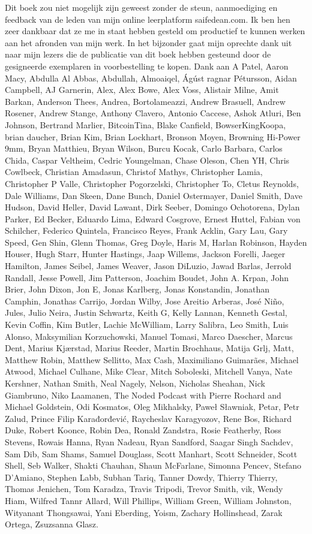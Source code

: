 \documentclass[
  a5paper,
  smalldemyvopaper,11pt,twoside,onecolumn,openright,extrafontsizes,
hidelinks]{memoir}
\begin{document}
Dit boek zou niet mogelijk zijn geweest zonder de steun, aanmoediging en
feedback van de leden van mijn online leerplatform saifedean.com. Ik ben
hen zeer dankbaar dat ze me in staat hebben gesteld om productief te
kunnen werken aan het afronden van mijn werk. In het bijzonder gaat mijn
oprechte dank uit naar mijn lezers die de publicatie van dit boek hebben
gesteund door de gesigneerde exemplaren in voorbestelling te kopen. Dank
aan A Patel, Aaron Macy, Abdulla Al Abbas, Abdullah, Almoaiqel, Ágúst
ragnar Pétursson, Aidan Campbell, AJ Garnerin, Alex, Alex Bowe, Alex
Voss, Alistair Milne, Amit Barkan, Anderson Thees, Andrea,
Bortolameazzi, Andrew Brasuell, Andrew Rosener, Andrew Stange, Anthony
Clavero, Antonio Caccese, Ashok Atluri, Ben Johnson, Bertrand Marlier,
BitcoinTina, Blake Canfield, BowserKingKoopa, brian daucher, Brian Kim,
Brian Lockhart, Bronson Moyen, Browning Hi-Power 9mm, Bryan Matthieu,
Bryan Wilson, Burcu Kocak, Carlo Barbara, Carlos Chida, Caspar Veltheim,
Cedric Youngelman, Chase Oleson, Chen YH, Chris Cowlbeck, Christian
Amadasun, Christof Mathys, Christopher Lamia, Christopher P Valle,
Christopher Pogorzelski, Christopher To, Cletus Reynolds, Dale Williams,
Dan Skeen, Dane Bunch, Daniel Ostermayer, Daniel Smith, Dave Hudson,
David Heller, David Lawant, Dirk Seeber, Domingo Ochotorena, Dylan
Parker, Ed Becker, Eduardo Lima, Edward Cosgrove, Ernest Huttel, Fabian
von Schilcher, Federico Quintela, Francisco Reyes, Frank Acklin, Gary
Lau, Gary Speed, Gen Shin, Glenn Thomas, Greg Doyle, Haris M, Harlan
Robinson, Hayden Houser, Hugh Starr, Hunter Hastings, Jaap Willems,
Jackson Forelli, Jaeger Hamilton, James Seibel, James Weaver, Jason
DiLuzio, Jawad Barlas, Jerrold Randall, Jesse Powell, Jim Patterson,
Joachim Boudet, John A. Krpan, John Brier, John Dixon, Jon E, Jonas
Karlberg, Jonas Konstandin, Jonathan Camphin, Jonathas Carrijo, Jordan
Wilby, Jose Areitio Arberas, José Niño, Jules, Julio Neira, Justin
Schwartz, Keith G, Kelly Lannan, Kenneth Gestal, Kevin Coffin, Kim
Butler, Lachie McWilliam, Larry Salibra, Leo Smith, Luis Alonso,
Maksymilian Korzuchowski, Manuel Tomasi, Marco Daescher, Marcus Dent,
Marius Kjærstad, Marius Reeder, Martin Brochhaus, Matija Grlj, Matt,
Matthew Robin, Matthew Sellitto, Max Cash, Maximiliano Guimarães,
Michael Atwood, Michael Culhane, Mike Clear, Mitch Soboleski, Mitchell
Vanya, Nate Kershner, Nathan Smith, Neal Nagely, Nelson, Nicholas
Sheahan, Nick Giambruno, Niko Laamanen, The Noded Podcast with Pierre
Rochard and Michael Goldstein, Odi Kosmatos, Oleg Mikhalsky, Paweł
Sławniak, Petar, Petr Zalud, Prince Filip Karađorđević, Raycheslav
Karagyozov, Rene Bos, Richard Duke, Robert Koonce, Robin Dea, Ronald
Zandstra, Rosie Featherby, Ross Stevens, Rowais Hanna, Ryan Nadeau, Ryan
Sandford, Saagar Singh Sachdev, Sam Dib, Sam Shams, Samuel Douglass,
Scott Manhart, Scott Schneider, Scott Shell, Seb Walker, Shakti Chauhan,
Shaun McFarlane, Simonna Pencev, Stefano D'Amiano, Stephen Labb, Subhan
Tariq, Tanner Dowdy, Thierry Thierry, Thomas Jenichen, Tom Karadza,
Travis Tripodi, Trevor Smith, vik, Wendy Hiam, Wilfred Tannr Allard,
Will Phillips, William Green, William Johnston, Wityanant Thongsawai,
Yani Eberding, Yoism, Zachary Hollinshead, Zarak Ortega, Zsuzsanna
Glasz.
\end{document}

